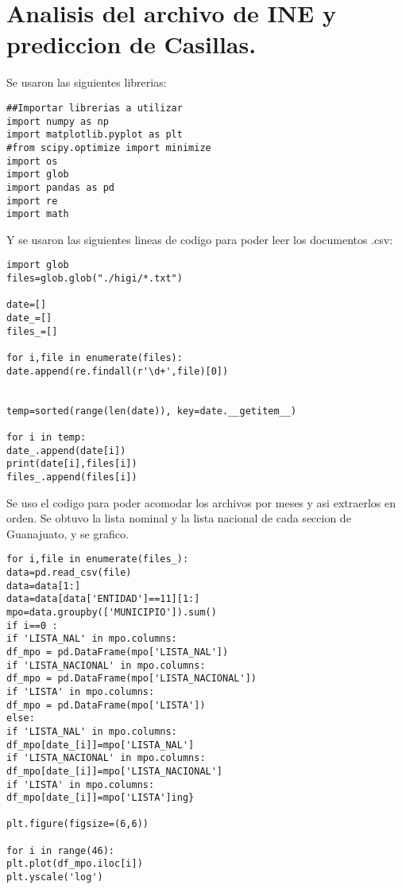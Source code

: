 \documentclass[
	12pt, %
]{fphw}
\begin{document}
\section*{Analisis del archivo de INE y prediccion de Casillas.}

Se usaron las siguientes librerias:

\lstset{language=Python}
\lstset{frame=lines}
\lstset{basicstyle=\footnotesize}
\begin{lstlisting}
##Importar librerias a utilizar 
import numpy as np
import matplotlib.pyplot as plt
#from scipy.optimize import minimize
import os
import glob 
import pandas as pd
import re
import math
\end{lstlisting}

Y se usaron las siguientes lineas de codigo para poder leer los documentos .csv:

\lstset{language=Python}
\lstset{frame=lines}
\lstset{basicstyle=\footnotesize}
\begin{lstlisting}
import glob
files=glob.glob("./higi/*.txt")

date=[]
date_=[]
files_=[]

for i,file in enumerate(files):
date.append(re.findall(r'\d+',file)[0])


temp=sorted(range(len(date)), key=date.__getitem__)

for i in temp:
date_.append(date[i])
print(date[i],files[i])
files_.append(files[i])
\end{lstlisting}

Se uso el codigo para poder acomodar los archivos por meses y asi extraerlos en orden.
Se obtuvo la lista nominal y la lista nacional de cada seccion de Guanajuato, y se grafico.

\lstset{language=Python}
\lstset{frame=lines}
\lstset{basicstyle=\footnotesize}
\begin{lstlisting}
for i,file in enumerate(files_):
data=pd.read_csv(file)
data=data[1:]
data=data[data['ENTIDAD']==11][1:]
mpo=data.groupby(['MUNICIPIO']).sum()
if i==0 :
if 'LISTA_NAL' in mpo.columns:
df_mpo = pd.DataFrame(mpo['LISTA_NAL'])
if 'LISTA_NACIONAL' in mpo.columns:
df_mpo = pd.DataFrame(mpo['LISTA_NACIONAL'])
if 'LISTA' in mpo.columns:
df_mpo = pd.DataFrame(mpo['LISTA'])
else:
if 'LISTA_NAL' in mpo.columns:
df_mpo[date_[i]]=mpo['LISTA_NAL']
if 'LISTA_NACIONAL' in mpo.columns:
df_mpo[date_[i]]=mpo['LISTA_NACIONAL']
if 'LISTA' in mpo.columns:
df_mpo[date_[i]]=mpo['LISTA']ing}

plt.figure(figsize=(6,6))

for i in range(46):
plt.plot(df_mpo.iloc[i])
plt.yscale('log')
\end{lstlisting}
\end{document}
